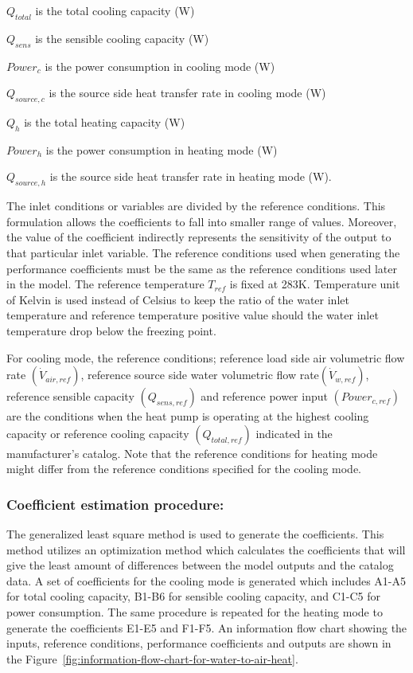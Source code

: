 \({Q_{total}}\) is the total cooling capacity (W)

\({Q_{sens}}\) is the sensible cooling capacity (W)

\(Powe{r_c}\) is the power consumption in cooling mode (W)

\({Q_{source,c}}\) is the source side heat transfer rate in cooling mode (W)

\({Q_h}\) is the total heating capacity (W)

\(Powe{r_h}\) is the power consumption in heating mode (W)

\({Q_{source,h}}\) is the source side heat transfer rate in heating mode (W).

The inlet conditions or variables are divided by the reference conditions. This formulation allows the coefficients to fall into smaller range of values. Moreover, the value of the coefficient indirectly represents the sensitivity of the output to that particular inlet variable. The reference conditions used when generating the performance coefficients must be the same as the reference conditions used later in the model. The reference temperature \({T_{ref}}\) is fixed at 283K. Temperature unit of Kelvin is used instead of Celsius to keep the ratio of the water inlet temperature and reference temperature positive value should the water inlet temperature drop below the freezing point.

For cooling mode, the reference conditions; reference load side air volumetric flow rate \(\left( {{{\dot V}_{air,ref}}} \right)\), reference source side water volumetric flow rate\(\left( {{{\dot V}_{w,ref}}} \right)\), reference sensible capacity \(\left( {{Q_{sens,ref}}} \right)\) and reference power input \(\left( {Powe{r_{c,ref}}} \right)\) are the conditions when the heat pump is operating at the highest cooling capacity or reference cooling capacity \(\left( {{Q_{total,ref}}} \right)\) indicated in the manufacturer's catalog. Note that the reference conditions for heating mode might differ from the reference conditions specified for the cooling mode.

\subsubsection{Coefficient estimation procedure:}\label{coefficient-estimation-procedure}

The generalized least square method is used to generate the coefficients. This method utilizes an optimization method which calculates the coefficients that will give the least amount of differences between the model outputs and the catalog data. A set of coefficients for the cooling mode is generated which includes A1-A5 for total cooling capacity, B1-B6 for sensible cooling capacity, and C1-C5 for power consumption. The same procedure is repeated for the heating mode to generate the coefficients E1-E5 and F1-F5. An information flow chart showing the inputs, reference conditions, performance coefficients and outputs are shown in the Figure~\ref{fig:information-flow-chart-for-water-to-air-heat}.

